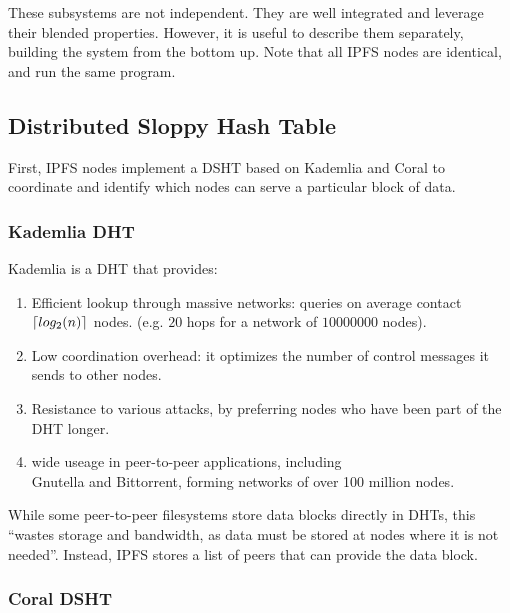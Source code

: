 \documentclass{sig-alternate}
\DeclarePairedDelimiter{\ceil}{\lceil}{\rceil}
\begin{document}
These subsystems are not independent. They are well integrated and leverage
their blended properties. However, it is useful to describe them separately,
building the system from the bottom up. Note that all IPFS nodes are identical,
and run the same program.

\subsection{Distributed Sloppy Hash Table}

First, IPFS nodes implement a DSHT based on Kademlia and Coral to coordinate
and identify which nodes can serve a particular block of data.

\subsubsection{Kademlia DHT}

Kademlia is a DHT that provides:

\begin{enumerate}

  \item Efficient lookup through massive networks:
        queries on average contact $ \ceil{log_2 (n)} $ nodes.
        (e.g. $20$ hops for a network of $10000000$ nodes).

  \item Low coordination overhead: it optimizes the number of
        control messages it sends to other nodes.

  \item Resistance to various attacks, by preferring nodes who have been
        part of the DHT longer.

  \item wide useage in peer-to-peer applications, including \\
        Gnutella and Bittorrent, forming networks of over 100 million nodes.

 \end{enumerate}

While some peer-to-peer filesystems store data blocks directly in DHTs,
this ``wastes storage and bandwidth, as data must be stored at nodes where it
is not needed''. Instead, IPFS stores a list of peers that can provide the data block.

\subsubsection{Coral DSHT}
\end{document}
